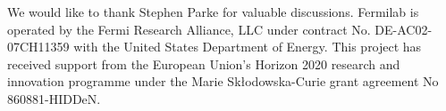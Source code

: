 \documentclass[letter,11pt]{article}
\begin{document}
\begin{acknowledgments}
\noindent We would like to thank Stephen Parke for valuable discussions. Fermilab is operated by the Fermi Research Alliance, LLC under contract No. DE-AC02-07CH11359 with the United States Department of Energy. This project has received support from the European Union’s Horizon 2020 research and innovation programme under the Marie Skłodowska-Curie grant agreement No 860881-HIDDeN.

\end{acknowledgments}



\end{document}
